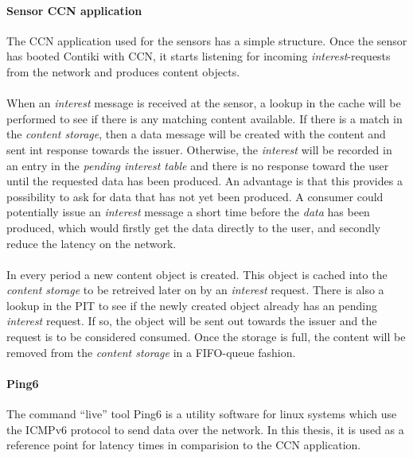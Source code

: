 \paragraph{Sensor CCN application}
The CCN application used for the sensors has a simple structure. Once the sensor has booted Contiki with CCN, it starts listening for incoming \textit{interest}-requests from the network and produces content objects.\\\\
When an \textit{interest} message is received at the sensor, a lookup in the cache will be performed to see if there is any matching content available. If there is a match in the \textit{content storage}, then a data message will be created with the content and sent int response towards the issuer. Otherwise, the \textit{interest} will be recorded in an entry in the \textit{pending interest table} and there is no response toward the user until the requested data has been produced.
An advantage is that this provides a possibility to ask for data that has not yet been produced. 
A consumer could potentially issue an \textit{interest} message a short time before the \textit{data} has been produced, which would firstly get the data directly to the user, and secondly reduce the latency on the network. 
\\\\
In every period a new content object is created. This object is cached into the \textit{content storage} to be retreived later on by an \textit{interest} request. There is also a lookup in the PIT to see if the newly created object already has an pending \textit{interest} request. If so, the object will be sent out towards the issuer and the request is to be considered consumed. Once the storage is full, the content will be removed from the \textit{content storage} in a FIFO-queue fashion.


\paragraph{Ping6}
The command ``live'' tool Ping6 is a utility software for linux systems which use the ICMPv6 protocol to send data over the network. In this thesis, it is used as a reference point for latency times in comparision to the CCN application.

